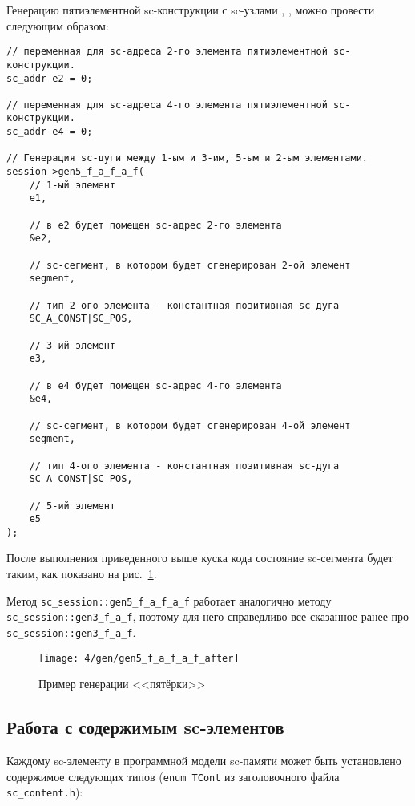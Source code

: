 Генерацию пятиэлементной sc-конструкции с sc-узлами ,
,  можно провести следующим образом:

\begin{lstlisting}[texcl]
// переменная для sc-адреса 2-го элемента пятиэлементной sc-конструкции.
sc_addr e2 = 0;

// переменная для sc-адреса 4-го элемента пятиэлементной sc-конструкции.
sc_addr e4 = 0;

// Генерация sc-дуги между 1-ым и 3-им, 5-ым и 2-ым элементами.
session->gen5_f_a_f_a_f(
    // 1-ый элемент
    e1,

    // в e2 будет помещен sc-адрес 2-го элемента
    &e2,

    // sc-сегмент, в котором будет сгенерирован 2-ой элемент
    segment,

    // тип 2-ого элемента - константная позитивная sc-дуга
    SC_A_CONST|SC_POS,

    // 3-ий элемент
    e3,

    // в e4 будет помещен sc-адрес 4-го элемента
    &e4,

    // sc-сегмент, в котором будет сгенерирован 4-ой элемент
    segment,

    // тип 4-ого элемента - константная позитивная sc-дуга
    SC_A_CONST|SC_POS,

    // 5-ий элемент
    e5
);
\end{lstlisting}

После выполнения приведенного выше куска кода состояние sc-сегмента
будет таким, как показано на рис.~\ref{fig:gen5_f_a_f_a_f_after}.

Метод \lstinline|sc_session::gen5_f_a_f_a_f| работает аналогично
методу \lstinline|sc_session::gen3_f_a_f|, поэтому для него
справедливо все сказанное ранее про
\lstinline|sc_session::gen3_f_a_f|.

\begin{figure}
  \centering
  \texttt{[image: 4/gen/gen5\_f\_a\_f\_a\_f\_after]}
  \caption{Пример генерации <<пятёрки>>}
  \label{fig:gen5_f_a_f_a_f_after}
\end{figure}

\subsection{Работа с содержимым sc-элементов}
\label{sec:libsc_content}

Каждому sc-элементу в программной модели sc-памяти может быть
установлено содержимое следующих типов (\lstinline|enum TCont| из
заголовочного файла \verb|sc_content.h|):

